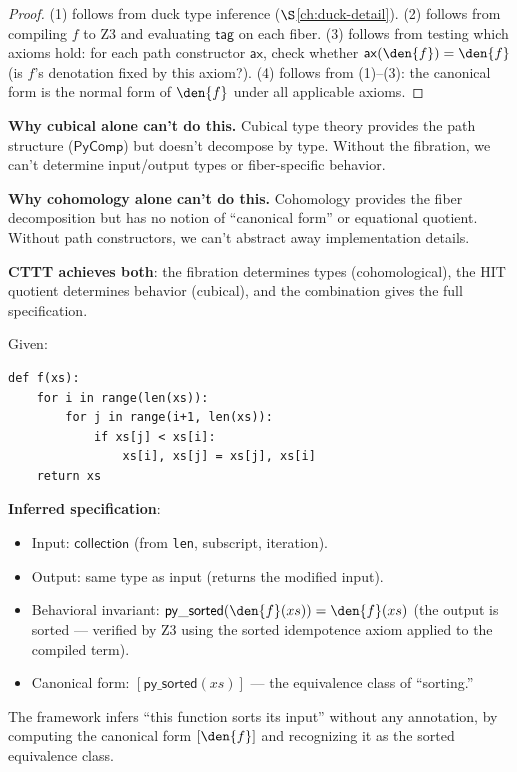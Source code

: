 \begin{proof}
(1) follows from duck type inference ($\S$\ref{ch:duck-detail}).
(2) follows from compiling $f$ to Z3 and evaluating $\mathsf{tag}$
on each fiber.
(3) follows from testing which axioms hold: for each path constructor
$\mathsf{ax}$, check whether $\mathsf{ax}(\den{f}) = \den{f}$
(is $f$'s denotation fixed by this axiom?).
(4) follows from (1)--(3): the canonical form is the normal form of
$\den{f}$ under all applicable axioms.
\end{proof}

\textbf{Why cubical alone can't do this.}
Cubical type theory provides the path structure ($\mathsf{PyComp}$)
but doesn't decompose by type.  Without the fibration, we can't
determine input/output types or fiber-specific behavior.

\textbf{Why cohomology alone can't do this.}
Cohomology provides the fiber decomposition but has no notion of
``canonical form'' or equational quotient.  Without path constructors,
we can't abstract away implementation details.

\textbf{CTTT achieves both}: the fibration determines types (cohomological),
the HIT quotient determines behavior (cubical), and the combination
gives the full specification.

\begin{example}
Given:
\begin{lstlisting}
def f(xs):
    for i in range(len(xs)):
        for j in range(i+1, len(xs)):
            if xs[j] < xs[i]:
                xs[i], xs[j] = xs[j], xs[i]
    return xs
\end{lstlisting}

\textbf{Inferred specification}:
\begin{itemize}
  \item Input: $\mathsf{collection}$ (from \texttt{len}, subscript,
    iteration).
  \item Output: same type as input (returns the modified input).
  \item Behavioral invariant: $\mathsf{py\_sorted}(\den{f}(xs)) =
    \den{f}(xs)$ (the output is sorted --- verified by Z3 using
    the sorted idempotence axiom applied to the compiled term).
  \item Canonical form: $[\mathsf{py\_sorted}(xs)]$ --- the
    equivalence class of ``sorting.''
\end{itemize}

The framework infers ``this function sorts its input'' without any
annotation, by computing the canonical form $[\den{f}]$ and
recognizing it as the sorted equivalence class.
\end{example}

